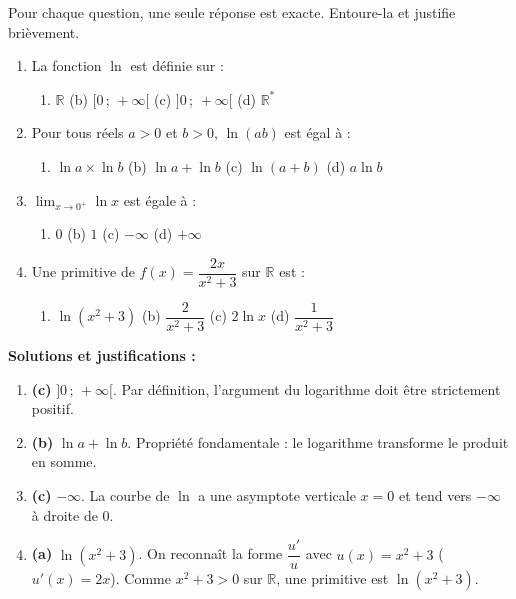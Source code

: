 \documentclass[11pt]{article}
\begin{document}
\begin{exoresolu}
Pour chaque question, une seule réponse est exacte. Entoure-la et justifie brièvement.
\begin{enumerate}
\item La fonction $\ln$ est définie sur :
\begin{enumerate}
\item[(a)] $\mathbb{R}$ \qquad (b) $[0\,;\,+\infty[$ \qquad (c) $]0\,;\,+\infty[$ \qquad (d) $\mathbb{R}^*$
\end{enumerate}
\item Pour tous réels $a>0$ et $b>0$, $\ln(ab)$ est égal à :
\begin{enumerate}
\item[(a)] $\ln a \times \ln b$ \qquad (b) $\ln a + \ln b$ \qquad (c) $\ln(a+b)$ \qquad (d) $a\ln b$
\end{enumerate}
\item $\displaystyle\lim_{x\to 0^+}\ln x$ est égale à :
\begin{enumerate}
\item[(a)] $0$ \qquad (b) $1$ \qquad (c) $-\infty$ \qquad (d) $+\infty$
\end{enumerate}
\item Une primitive de $f(x)=\dfrac{2x}{x^2+3}$ sur $\mathbb{R}$ est :
\begin{enumerate}
\item[(a)] $\ln(x^2+3)$ \qquad (b) $\dfrac{2}{x^2+3}$ \qquad (c) $2\ln x$ \qquad (d) $\dfrac{1}{x^2+3}$
\end{enumerate}
\end{enumerate}
\tcblower
\textbf{Solutions et justifications :}
\begin{enumerate}
\item \textbf{(c)} $]0\,;\,+\infty[$. Par définition, l'argument du logarithme doit être strictement positif.
\item \textbf{(b)} $\ln a + \ln b$. Propriété fondamentale : le logarithme transforme le produit en somme.
\item \textbf{(c)} $-\infty$. La courbe de $\ln$ a une asymptote verticale $x=0$ et tend vers $-\infty$ à droite de $0$.
\item \textbf{(a)} $\ln(x^2+3)$. On reconnaît la forme $\dfrac{u'}{u}$ avec $u(x)=x^2+3$ ($u'(x)=2x$). Comme $x^2+3>0$ sur $\mathbb{R}$, une primitive est $\ln(x^2+3)$.
\end{enumerate}
\end{exoresolu}
\end{document}
